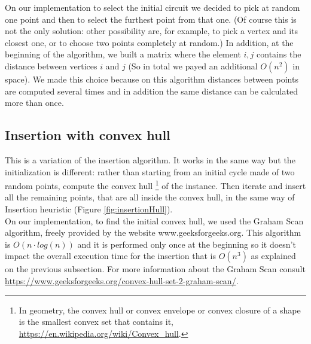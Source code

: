 \noindent On our implementation to select the initial circuit we decided to pick at random one point and then to select the furthest point from that one. (Of course this is not the only solution: other possibility are, for example, to pick a vertex and its closest one, or to choose two points completely at random.) In addition, at the beginning of the algorithm, we built a matrix where the element $i,j$ contains the distance between vertices $i$ and $j$ (So in total we payed an additional $O(n^2)$ in space). We made this choice because on this algorithm distances between points are computed several times and in addition the same distance can be calculated more than once.\\


\subsection{Insertion with convex hull}
This is a variation of the insertion algorithm. It works in the same way but the initialization is different: rather than starting from an initial cycle made of two random points, compute the convex hull \footnote{In geometry, the convex hull or convex envelope or convex closure of a shape is the smallest convex set that contains it, \url{https://en.wikipedia.org/wiki/Convex_hull}.
} of the instance. Then iterate and insert all the remaining points, that are all inside the convex hull, in the same way of Insertion heuristic (Figure \ref{fig:insertionHull}).\\
On our implementation, to find the initial convex hull, we used the Graham Scan algorithm, freely provided by the website www.geeksforgeeks.org. This algorithm is $O(n \cdot log(n))$ and it is performed only once at the beginning so it doesn't impact the overall execution time for the insertion that is $O(n^3)$ as explained on the previous subsection. For more information about the Graham Scan consult \url{https://www.geeksforgeeks.org/convex-hull-set-2-graham-scan/}.

